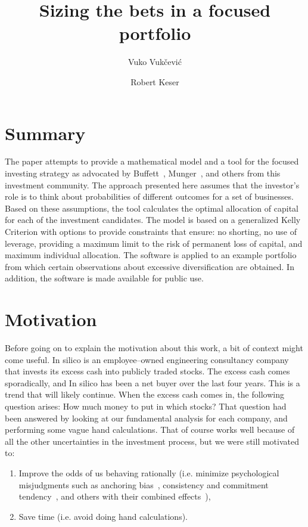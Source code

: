 \documentclass{article}
\title{Sizing the bets in a focused portfolio}
\author[$\dagger$]{Vuko Vuk\v{c}evi\'{c}}
\author[$\dagger$]{Robert Keser}
\affil[$\dagger$]{In silico Ltd., Zagreb, Croatia,\linebreak vuko.vukcevic@insilico.hr, robert.keser@insilico.hr}
\begin{document}
\maketitle

\section{Summary}
\label{sec:summary}

The paper attempts to provide a mathematical model and a tool for the focused
investing strategy as advocated by Buffett~\cite{berkshireLetters},
Munger~\cite{almanack}, and others from this investment community.
The approach presented here assumes that the investor's role is to think about
probabilities of different outcomes for a set of businesses. Based on these
assumptions, the tool calculates the optimal allocation of capital for
each of the investment candidates. The model is based on a generalized Kelly
Criterion with options to provide constraints that ensure: no shorting, no use
of leverage, providing a maximum limit to the risk of permanent loss of capital,
and maximum individual allocation. The software is applied to an example
portfolio from which certain observations about excessive diversification are
obtained. In addition, the software is made available for public use.\\

\section{Motivation}
\label{sec:motivation}

Before going on to explain the motivation about this work, a bit of context
might come useful. In silico is an employee--owned engineering consultancy
company that invests its excess cash into publicly traded stocks. The excess
cash comes sporadically, and In silico has been a net buyer over the last four
years. This is a trend that will likely continue. When the excess cash comes in,
the following question arises: How much money to put in which stocks? That
question had been answered by looking at our fundamental analysis for each
company, and performing some vague hand calculations. That of course works well
because of all the other uncertainties in the investment process, but we were
still motivated to:
\begin{enumerate}
    \item Improve the odds of us behaving rationally (i.e. minimize
    psychological misjudgments such as anchoring bias~\cite{kahneman},
    consistency and commitment tendency~\cite{cialdini}, and
    others with their combined effects~\cite{almanack}),
    \item Save time (i.e. avoid doing hand calculations).
\end{enumerate}
\end{document}
